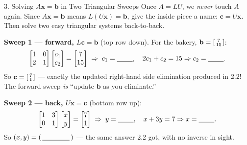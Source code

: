 \documentclass[10pt]{article}
\newcommand{\xx}{\mathbf{x}}
\newcommand{\bb}{\mathbf{b}}
\newcommand{\cc}{\mathbf{c}}
\begin{document}
\begin{notesbox}{3. Solving $A\xx=\bb$ in Two Triangular Sweeps}
Once $A=LU$, we \emph{never} touch $A$ again. Since $A\xx=\bb$ means $L(U\xx)=\bb$, give the inside
piece a name: $\cc=U\xx$. Then solve two easy triangular systems back-to-back.

\vspace{3pt}
\textbf{Sweep 1 --- forward, $L\cc=\bb$} (top row down). For the bakery, $\bb=\begin{bsmallmatrix} 7\\15 \end{bsmallmatrix}$:
\[
  \begin{bmatrix} 1 & 0 \\ 2 & 1 \end{bmatrix}\begin{bmatrix} c_1 \\ c_2 \end{bmatrix} = \begin{bmatrix} 7 \\ 15 \end{bmatrix}
  \;\Rightarrow\; c_1 = \blank{0.8cm},\quad 2c_1 + c_2 = 15 \Rightarrow c_2 = \blank{0.8cm}.
\]
So $\cc=\begin{bsmallmatrix} 7\\1 \end{bsmallmatrix}$ --- exactly the updated right-hand side elimination produced in 2.2!
The forward sweep \emph{is} ``update $\bb$ as you eliminate.''

\vspace{3pt}
\textbf{Sweep 2 --- back, $U\xx=\cc$} (bottom row up):
\[
  \begin{bmatrix} 1 & 3 \\ 0 & 1 \end{bmatrix}\begin{bmatrix} x \\ y \end{bmatrix} = \begin{bmatrix} 7 \\ 1 \end{bmatrix}
  \;\Rightarrow\; y = \blank{0.8cm},\quad x + 3y = 7 \Rightarrow x = \blank{0.8cm}.
\]
So $(x,y)=(\,\blank{1.4cm}\,)$ --- the same answer 2.2 got, with no inverse in sight.
\end{notesbox}
\end{document}
